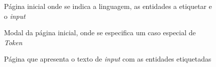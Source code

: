 \documentclass[12pt]{article}
\begin{document}
\begin{figure}[!ht]
	\centering
	\setlength{\abovecaptionskip}{-.4cm}
	\caption{Página inicial onde se indica a linguagem, as entidades a etiquetar e o \textit{input}}
\end{figure}

\begin{figure}[!ht]
	\centering
	\setlength{\abovecaptionskip}{-.4cm}
	\caption{Modal da página inicial, onde se especifica um caso especial de \textit{Token}}
\end{figure}

\begin{figure}[!ht]
	\centering
	\setlength{\abovecaptionskip}{-.4cm}
	\caption{Página que apresenta o texto de \textit{input} com as entidades etiquetadas}
\end{figure}
\end{document}
